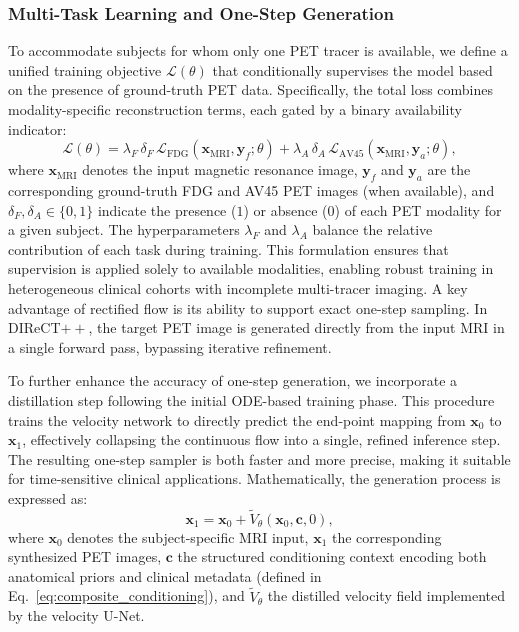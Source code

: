 \documentclass{article}
\begin{document}
\subsubsection{Multi-Task Learning and One-Step Generation}
To accommodate subjects for whom only one PET tracer is available, we define a unified training objective $\mathcal{L}(\theta)$ that conditionally supervises the model based on the presence of ground-truth PET data. Specifically, the total loss combines modality-specific reconstruction terms, each gated by a binary availability indicator:
\begin{equation}
\mathcal{L}(\theta) = \lambda_F \, \delta_F \, \mathcal{L}_{\text{FDG}}(\mathbf{x}_{\text{MRI}}, \mathbf{y}_f; \theta) + \lambda_A \, \delta_A \, \mathcal{L}_{\text{AV45}}(\mathbf{x}_{\text{MRI}}, \mathbf{y}_a; \theta),
\label{eq:multitask_loss}
\end{equation}
where $\mathbf{x}_{\text{MRI}}$ denotes the input magnetic resonance image, $\mathbf{y}_f$ and $\mathbf{y}_a$ are the corresponding ground-truth FDG and AV45 PET images (when available), and $\delta_F, \delta_A \in \{0,1\}$ indicate the presence ($1$) or absence ($0$) of each PET modality for a given subject. The hyperparameters $\lambda_F$ and $\lambda_A$ balance the relative contribution of each task during training. This formulation ensures that supervision is applied solely to available modalities, enabling robust training in heterogeneous clinical cohorts with incomplete multi-tracer imaging.
A key advantage of rectified flow is its ability to support exact one-step sampling. In DIReCT$++$, the target PET image is generated directly from the input MRI in a single forward pass, bypassing iterative refinement. 

To further enhance the accuracy of one-step generation, we incorporate a distillation step following the initial ODE-based training phase. This procedure trains the velocity network to directly predict the end-point mapping from $\mathbf{x}_0$ to $\mathbf{x}_1$, effectively collapsing the continuous flow into a single, refined inference step. The resulting one-step sampler is both faster and more precise, making it suitable for time-sensitive clinical applications. Mathematically, the generation process is expressed as:
\begin{equation}
\mathbf{x}_1 = \mathbf{x}_0 + \tilde{V}_\theta(\mathbf{x}_0, \mathbf{c}, 0),
\label{eq:onestep_generation}
\end{equation}
where $\mathbf{x}_0 $ denotes the subject-specific MRI input, $\mathbf{x}_1 $ the corresponding synthesized PET images, $\mathbf{c}$ the structured conditioning context encoding both anatomical priors and clinical metadata (defined in Eq.~\eqref{eq:composite_conditioning}), and $\tilde{V}_\theta$ the distilled velocity field implemented by the velocity U-Net.
\end{document}
